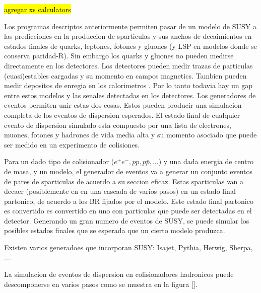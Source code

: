 \hl{agregar xs calculators}

\vsp

Los programas descriptos anteriormente permiten pasar de un modelo
de SUSY a las predicciones en la produccion de sparticulas y sus
anchos de decaimientos en estados finales de quarks, leptones, fotones
y gluones (y LSP en modelos donde se conserva paridad-R). Sin embargo
los quarks y gluones no pueden medirse directamente en los detectores.
Los detectores pueden medir trazas de particulas (cuasi)estables
cargadas y su momento en campos magnetics. Tambien pueden medir
depositos de enregia en los calorimetros .
Por lo tanto todavia hay un gap entre estos modelos y las senales
detectadas en los detectores. Los generadores de eventos permiten unir
estas dos cosas. Estos pueden producir una simulacion completa de los
eventos de dispersion esperados. El estado final de cualquier evento
de dispersion simulado esta compuesto por una lista de electrones,
muones, fotones y hadrones de vida media alta y su momento asociado
que puede ser medido en un experimento de colisiones.

Para un dado tipo de colisionador ($e^+e^-, pp, p\bar{p}, ...$) y una
dada energia de centro de masa, y un modelo, el generador de eventos
va a generar un conjunto eventos de pares de sparticulas de acuerdo
a su seccion eficaz. Estas sparticulas van a decaer (posiblemente
en en una cascada de varios pasos) en un estado final partonico,
de acuerdo a los BR fijados por el modelo. Este estado final partonico
es convertido es convertido en uno con particulas que puede ser detectadas
en el detector. Generando un gran numero de eventos de SUSY, se puede
simular los posibles estados finales que se esperada que un cierto
modelo produzca.

Existen varios generadoes que incorporan SUSY: Isajet, Pythia, Herwig, Sherpa, ....

La simulacion de eventos de dispersion en colisionadores hadronicos
puede descomponerse en varios pasos como se muestra en la figura [].

